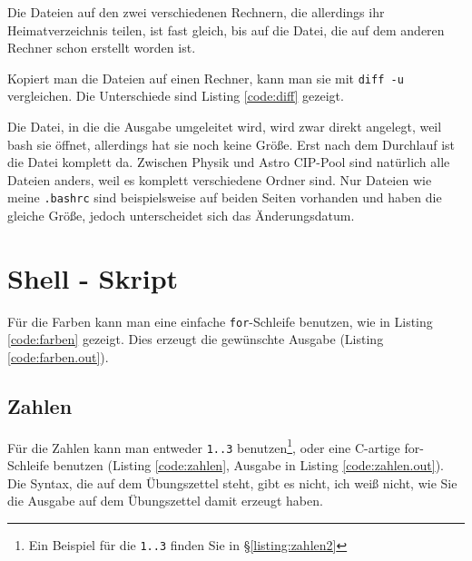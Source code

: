 Die Dateien auf den zwei verschiedenen Rechnern, die allerdings ihr Heimatverzeichnis teilen, ist fast gleich, bis auf die Datei, die auf dem anderen Rechner schon erstellt worden ist.

Kopiert man die Dateien auf einen Rechner, kann man sie mit \texttt{diff -u} vergleichen. Die Unterschiede sind Listing \ref{code:diff} gezeigt.


Die Datei, in die die Ausgabe umgeleitet wird, wird zwar direkt angelegt, weil bash sie öffnet, allerdings hat sie noch keine Größe. Erst nach dem Durchlauf ist die Datei komplett da. Zwischen Physik und Astro CIP-Pool sind natürlich alle Dateien anders, weil es komplett verschiedene Ordner sind. Nur Dateien wie meine \texttt{.bashrc} sind beispielsweise auf beiden Seiten vorhanden und haben die gleiche Größe, jedoch unterscheidet sich das Änderungsdatum.

\section{Shell - Skript}

Für die Farben kann man eine einfache \texttt{for}-Schleife benutzen, wie in Listing \ref{code:farben} gezeigt. Dies erzeugt die gewünschte Ausgabe (Listing \ref{code:farben.out}).






\subsection{Zahlen}

Für die Zahlen kann man entweder \texttt{{1..3}} benutzen\footnote{Ein Beispiel für die \texttt{{1..3}} finden Sie in §\ref{listing:zahlen2}}, oder eine C-artige for-Schleife benutzen (Listing \ref{code:zahlen}, Ausgabe in Listing \ref{code:zahlen.out}). Die Syntax, die auf dem Übungszettel steht, gibt es nicht, ich weiß nicht, wie Sie die Ausgabe auf dem Übungszettel damit erzeugt haben.




